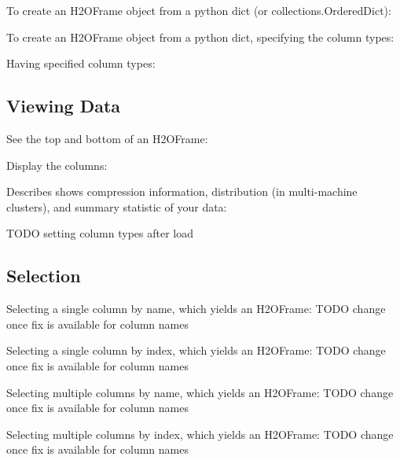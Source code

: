\waterExampleInPython
To create an H2OFrame object from a python dict (or collections.OrderedDict):


\waterExampleInPython
To create an H2OFrame object from a python dict, specifying the column types:


\waterExampleInPython
Having specified column types:


\subsection{Viewing Data}
\waterExampleInPython
See the top and bottom of an H2OFrame:


\waterExampleInPython
Display the columns:


\waterExampleInPython
Describes shows compression information, distribution (in multi-machine clusters), and summary statistic of your data:
\small

\normalsize

TODO setting column types after load


\subsection{Selection}
\waterExampleInPython
Selecting a single column by name, which yields an H2OFrame:
TODO change once fix is available for column names


\waterExampleInPython
Selecting a single column by index, which yields an H2OFrame:
TODO change once fix is available for column names


\waterExampleInPython
Selecting multiple columns by name, which yields an H2OFrame:
TODO change once fix is available for column names


\waterExampleInPython
Selecting multiple columns by index, which yields an H2OFrame:
TODO change once fix is available for column names


